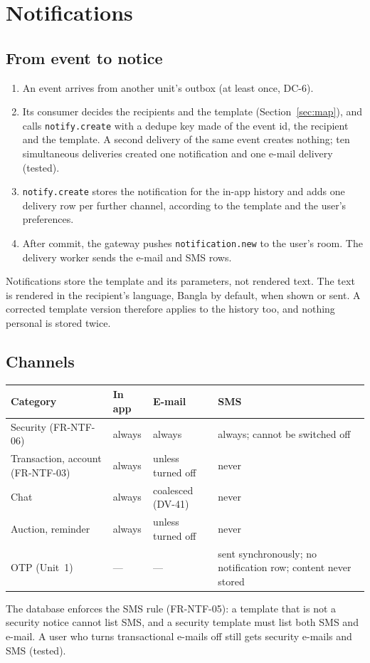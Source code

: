 \documentclass[11pt,a4paper]{article}
\newenvironment{dtable}[1]{\small\begin{longtable}{#1}}{\end{longtable}}
\begin{document}
\section{Notifications}
\label{sec:notify}

\subsection{From event to notice}
\begin{enumerate}[nosep]
  \item An event arrives from another unit's outbox (at least once, DC-6).
  \item Its consumer decides the recipients and the template (Section~\ref{sec:map}), and calls \texttt{notify.create} with a dedupe key made of the event id, the recipient and the template. A second delivery of the same event creates nothing; ten simultaneous deliveries created one notification and one e-mail delivery (tested).
  \item \texttt{notify.create} stores the notification for the in-app history and adds one delivery row per further channel, according to the template and the user's preferences.
  \item After commit, the gateway pushes \texttt{notification.new} to the user's room. The delivery worker sends the e-mail and SMS rows.
\end{enumerate}
Notifications store the template and its parameters, not rendered text. The text is rendered in the recipient's language, Bangla by default, when shown or sent. A corrected template version therefore applies to the history too, and nothing personal is stored twice.

\subsection{Channels}
\label{sec:channels}
\begin{dtable}{@{}>{\raggedright\arraybackslash}p{3.4cm}>{\raggedright\arraybackslash}p{2.3cm}>{\raggedright\arraybackslash}p{2.3cm}>{\raggedright\arraybackslash}p{7.0cm}@{}}
\toprule
\textbf{Category} & \textbf{In app} & \textbf{E-mail} & \textbf{SMS} \\ \midrule \endhead
Security (FR-NTF-06) & always & always & always; cannot be switched off \\
Transaction, account (FR-NTF-03) & always & unless turned off & never \\
Chat & always & coalesced (DV-41) & never \\
Auction, reminder & always & unless turned off & never \\
OTP (Unit~1) & --- & --- & sent synchronously; no notification row; content never stored \\
\bottomrule
\end{dtable}
The database enforces the SMS rule (FR-NTF-05): a template that is not a security notice cannot list SMS, and a security template must list both SMS and e-mail. A user who turns transactional e-mails off still gets security e-mails and SMS (tested).
\end{document}
